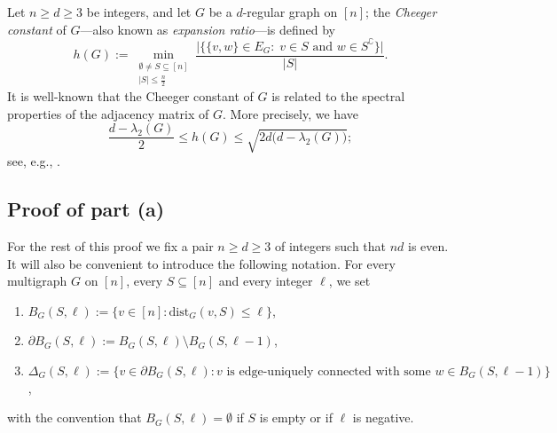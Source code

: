 \documentclass[11pt,leqno]{amsart}
\newtheorem{corollary}[theorem]{Corollary}
\theoremstyle{remark}
\theoremstyle{plain}
\begin{document}
Let $n\geqslant d\geqslant 3$ be integers, and let $G$ be a $d$-regular graph on $[n]$; the \emph{Cheeger constant} of $G$---also known as
\emph{expansion ratio}---is defined by
\[ h(G):= \min_{\substack{\emptyset \neq S\subseteq [n]\\ |S|\leqslant \frac{n}{2}}}
\frac{\big|\big\{ \{v,w\}\in E_G:\; v\in S \text{ and } w\in S^{\complement}\big\}\big|}{|S|}. \]
It is well-known that the Cheeger constant of $G$ is related to the spectral properties of the
adjacency matrix of $G$. More precisely, we have
\begin{equation} \label{e-cheeger-e1}
\frac{d-\lambda_2(G)}{2} \leqslant h(G) \leqslant \sqrt{2d\big(d-\lambda_2(G)\big)};
\end{equation}
see, e.g., \cite[Theorem 4.1]{HLW06}.

\subsection{Proof of part (a)}

For the rest of this proof we fix a pair $n\geqslant d\geqslant 3$ of integers such that $nd$ is even.
It will also be convenient to
introduce the following notation. For every multigraph $G$ on $[n]$, every $S\subseteq [n]$
and every integer $\ell$, we set
\begin{enumerate}
\item[$\bullet$] $B_G(S,\ell) := \big\{ v\in[n]\colon \mathrm{dist}_G (v,S)\leqslant\ell\big\}$,
\item[$\bullet$] $\partial B_G(S,\ell):=  B_G(S,\ell) \setminus B_G(S,\ell-1)$,
\item[$\bullet$] $\Delta_G(S,\ell) := \big\{v\in\partial B_G(S,\ell)\colon v \text{ is edge-uniquely connected with some } w\in B_G(S,\ell-1)\big\}$,
\end{enumerate}
with the convention that $B_G(S,\ell)=\emptyset$ if $S$ is empty or if $\ell$ is negative.
\end{document}
